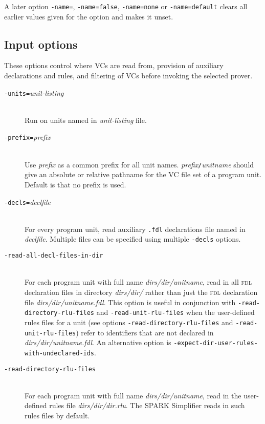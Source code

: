 \documentclass[12pt,fleqn]{article}
\newcommand{\fdl}{\textsc{fdl}}
\newcommand{\optionb}[1]{\item[\texttt{-{#1}}]\ \\}
\newcommand{\optionv}[2]{\item[\texttt{-{#1}=}\mdseries\textit{#2}]\ \\}
\begin{document}
A later option 
\texttt{-name=},
\texttt{-name=false},
\texttt{-name=none} or 
\texttt{-name=default}
clears all earlier values given for the option and makes it unset.

\subsection{Input options}

These options control where VCs are read from, provision of auxiliary
declarations and rules, and filtering of VCs before invoking the selected
prover.

\begin{description}

  \optionv{units}{unit-listing}  Run on units named in \textit{unit-listing}
   file.

  \optionv{prefix}{prefix} 
    Use \textit{prefix} as a common prefix for all unit names.  
    \textit{prefix}\texttt{/}\textit{unitname} should give an absolute or
    relative pathname for the VC file set of a program unit.  Default is
    that no prefix is used.
   
  \optionv{decls}{declfile}
    For every program unit, read auxiliary \texttt{.fdl} 
    declarations file named in \textit{declfile}.  
    Multiple files can be specified using multiple 
    \texttt{-decls} options.

  \optionb{read-all-decl-files-in-dir}
  For each program unit with full name \textit{dirs/dir/unitname},
  read in all \fdl{} declaration files in directory \textit{dirs/dir/} rather
  than just the \fdl{} declaration file \textit{dirs/dir/unitname.fdl}.
  This option is useful in conjunction with 
  \texttt{-read-directory-rlu-files}
  and \texttt{-read-unit-rlu-files} when the user-defined rules files for a
  unit 
  (see options \texttt{-read-directory-rlu-files} 
   and \texttt{-read-unit-rlu-files})
  refer to identifiers that are not declared in \textit{dirs/dir/unitname.fdl}.
  An alternative option is \texttt{-expect-dir-user-rules-with-undeclared-ids}.

  \optionb{read-directory-rlu-files}
  For each program unit with full name \textit{dirs/dir/unitname},
  read in the user-defined rules file \textit{dirs/dir/dir.rlu}.  The SPARK
  Simplifier reads in such rules files by default.


\end{description}
\end{document}
